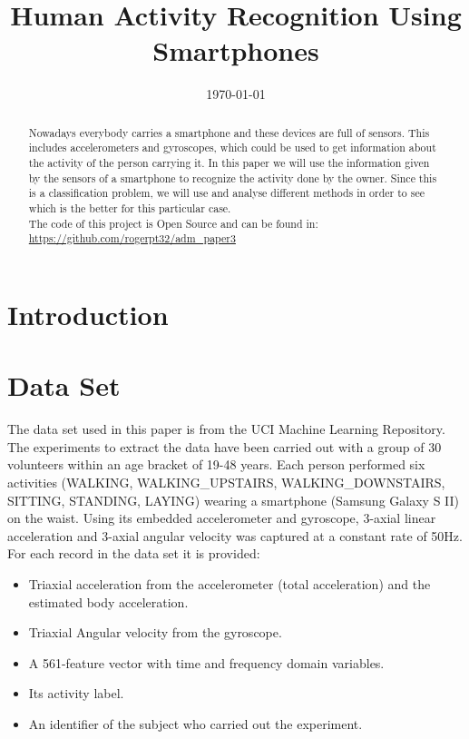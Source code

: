 \documentclass[conference]{IEEEtran}
\begin{document}
\title{Human Activity Recognition Using Smartphones}

\author{
}

\date{\today}

\maketitle

\begin{abstract}
Nowadays everybody carries a smartphone and these devices are full of sensors. This includes accelerometers and gyroscopes, which could be used to get information about the activity of the person carrying it. In this paper we will use the information given by the sensors of a smartphone to recognize the activity done by the owner. Since this is a classification problem, we will use and analyse different methods in order to see which is the better for this particular case.\\
The code of this project is Open Source and can be found in: \url{https://github.com/rogerpt32/adm_paper3}
\end{abstract}

\section{Introduction}
\section{Data Set}
The data set\cite{dataset} used in this paper is from the UCI Machine Learning Repository\cite{uci}. The experiments to extract the data have been carried out with a group of 30 volunteers within an age bracket of 19-48 years. Each person performed six activities (WALKING, WALKING\_UPSTAIRS, WALKING\_DOWNSTAIRS, SITTING, STANDING, LAYING) wearing a smartphone (Samsung Galaxy S II) on the waist. Using its embedded accelerometer and gyroscope, 3-axial linear acceleration and 3-axial angular velocity was captured at a constant rate of 50Hz. For each record in the data set it is provided:
\begin{itemize}
\item Triaxial acceleration from the accelerometer (total acceleration) and the estimated body acceleration.
\item Triaxial Angular velocity from the gyroscope.
\item A 561-feature vector with time and frequency domain variables.
\item Its activity label.
\item An identifier of the subject who carried out the experiment.
\end{itemize}



\end{document}
